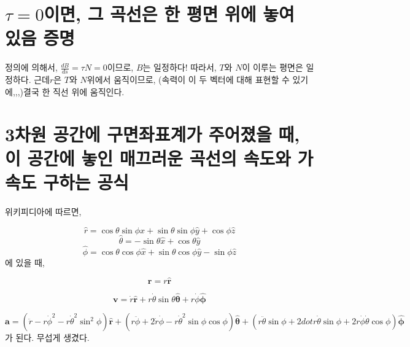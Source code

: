 \section{$\tau = 0$이면, 그 곡선은 한 평면 위에 놓여 있음 증명}
정의에 의해서, $\frac{dB}{ds} = \tau N = 0$이므로, $B$는 일정하다! 따라서, $T$와 $N$이 이루는 평면은 일정하다. 근데$r$은 $T$와 $N$위에서 움직이므로, (속력이 이 두 벡터에 대해 표현할 수 있기에,,,)결국 한 직선 위에 움직인다.
\section{3차원 공간에 구면좌표계가 주어졌을 때, 이 공간에 놓인 매끄러운 곡선의 속도와 가속도 구하는 공식 }
위키피디아에 따르면,

$$\hat{r} = \cos \theta \sin \phi \hat{x} + \sin \theta \sin \phi \hat{y} + \cos \phi \hat{z}$$
$$\hat{\theta} = - \sin \theta \hat{x} + \cos \theta \hat{y} $$
$$\hat{\phi} = \cos \theta \cos \phi \hat{x} + \sin \theta \cos \phi \hat{y} - \sin \phi \hat{z}$$
에 있을 때,

$$\mathbf{r} = r \hat{\mathbf{r}}$$

$$\mathbf{v} = \dot{r} \hat{\mathbf{r}} + r \dot{\theta} \sin \theta \hat{\mathbf{\theta}} + r \dot{\phi} \hat{\mathbf{\phi}} $$

$$\mathbf{a} = \left(\ddot{r} - r \dot{\phi}^2 - r \dot{\theta}^2 \sin^2 \phi \right)\hat{\mathbf{r}} + \left(r \ddot{\phi} + 2 \dot{r} \dot{\phi} - r \dot{\theta}^2 \sin \phi \cos \phi \right) \hat{\mathbf{\theta}} + \left( r \ddot{\theta} \sin \phi + 2 dot{r}\dot{\theta} \sin \phi + 2 r \dot{\phi}\dot{\theta} \cos \phi \right) \hat{\mathbf{\phi}}$$
가 된다. 무섭게 생겼다.